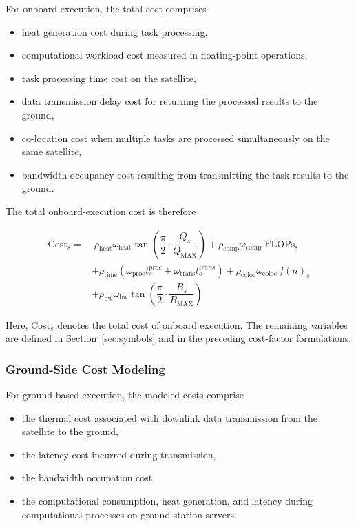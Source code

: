 \documentclass[lettersize,journal]{IEEEtran}
\begin{document}
For onboard execution, the total cost comprises
\begin{itemize}
    \item heat generation cost during task processing,  
    \item computational workload cost measured in floating-point operations,  
    \item task processing time cost on the satellite,  
    \item data transmission delay cost for returning the processed results to the ground,  
    \item co-location cost when multiple tasks are processed simultaneously on the same satellite,  
    \item bandwidth occupancy cost resulting from transmitting the task results to the ground.  
\end{itemize}

The total onboard-execution cost is therefore

\begin{equation}
\begin{aligned}
\mathrm{Cost}_{s} = {} & \; \rho_{\mathrm{heat}}\omega_{\mathrm{heat}}\tan\!\left(\dfrac{\pi}{2}\cdot\dfrac{Q_s}{Q_{\mathrm{MAX}}}\right)
+ \rho_{\mathrm{comp}}\omega_{\mathrm{comp}}\;\mathrm{FLOPs_s} \\
& + \rho_{\mathrm{time}}\left(\omega_{\mathrm{proc}} t^{proc}_{s} + \omega_{\mathrm{trans}} t^{trans}_{s}\right)
+ \rho_{\mathrm{coloc}}\omega_{\mathrm{coloc}}\,f(n)_s \\
& + \rho_{\mathrm{bw}}\omega_{\mathrm{bw}}\tan\!\left(\dfrac{\pi}{2}\cdot\dfrac{B_s}{B_{\mathrm{MAX}}}\right)
\end{aligned}
\label{eq:satellite_cost_sub}
\end{equation}

Here, $\mathrm{Cost}_{s}$ denotes the total cost of onboard execution. The remaining variables are defined in Section~\ref{sec:symbols} and in the preceding cost-factor formulations.

\subsubsection{Ground-Side Cost Modeling}

For ground-based execution, the modeled costs comprise

\begin{itemize}
    \item the thermal cost associated with downlink data transmission from the satellite to the ground,  
    \item the latency cost incurred during transmission, 
    \item the bandwidth occupation cost.  
    \item the computational consumption, heat generation, and latency during computational processes on ground station servers.
\end{itemize}
\end{document}
